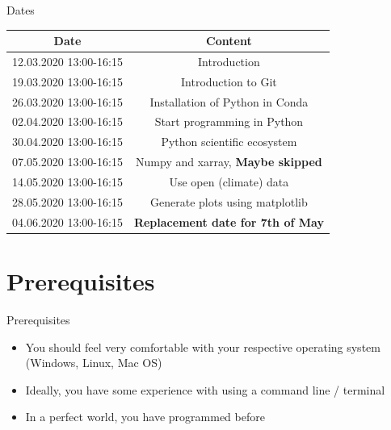 \documentclass[10pt,color=usenames,dvipsnames]{beamer}
\begin{document}
\begin{frame}{Dates}

	\begin{table}

	\begin{tabular}{|c|c|}
		\hline
		Date&Content\\
		\hline
		12.03.2020	13:00-16:15	& Introduction \\

		19.03.2020	13:00-16:15&Introduction to Git\\

		26.03.2020	13:00-16:15&Installation of Python in Conda\\

		02.04.2020	13:00-16:15&Start programming in Python\\

		30.04.2020	13:00-16:15&Python scientific ecosystem\\

		07.05.2020	13:00-16:15&Numpy and xarray, \textbf{Maybe skipped}\\

		14.05.2020	13:00-16:15& Use open (climate) data\\

		28.05.2020	13:00-16:15&Generate plots using matplotlib\\

		04.06.2020  13:00-16:15&\textbf{Replacement date for 7th of May}\\
		\hline
	\end{tabular}
\end{table}

\end{frame}


\section{Prerequisites}

\begin{frame}{Prerequisites}
	\begin{itemize}
        \item You should feel very comfortable with your respective operating system (Windows, Linux, Mac OS)
		\item Ideally, you have some experience with using a command line / terminal
		\item In a perfect world, you have programmed before
	\end{itemize}
\end{frame}
\end{document}
